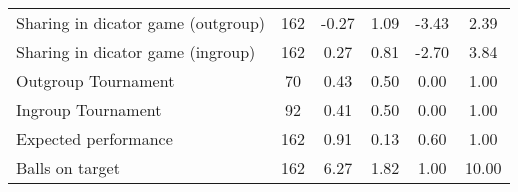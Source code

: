 {\begin{tabular}{l*{1}{ccccc}}
Sharing in dicator game (outgroup)        &         162&       -0.27&        1.09&       -3.43&        2.39\\
Sharing in dicator game (ingroup)    &         162&        0.27&        0.81&       -2.70&        3.84\\
Outgroup Tournament &          70&        0.43&        0.50&        0.00&        1.00\\
Ingroup Tournament  &          92&        0.41&        0.50&        0.00&        1.00\\
Expected performance&         162&        0.91&        0.13&        0.60&        1.00\\
Balls on target     &         162&        6.27&        1.82&        1.00&       10.00\\
\hline\hline
\end{tabular}
}
